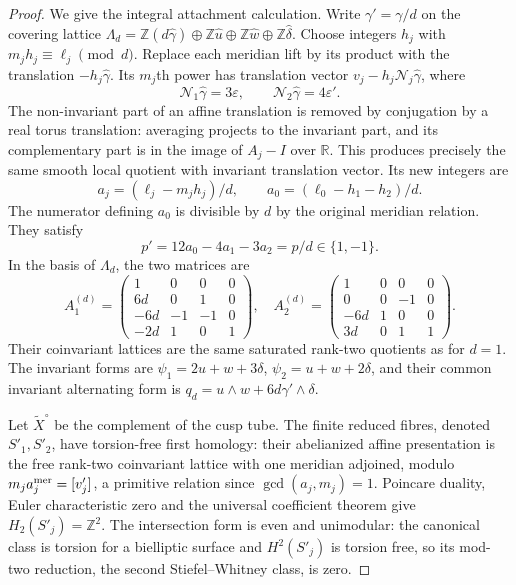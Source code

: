\begin{proof}
We give the integral attachment calculation. Write
$\gamma'=\gamma/d$ on the covering lattice
$\Lambda_d=\mathbb Z(d\widehat\gamma)\oplus\mathbb Z\widehat u
\oplus\mathbb Z\widehat w\oplus\mathbb Z\widehat\delta$.
Choose integers $h_j$ with
$m_jh_j\equiv\ell_j\pmod d$. Replace each meridian lift by its
product with the translation $-h_j\widehat\gamma$. Its $m_j$th power
has translation vector
$v_j-h_j\mathcal N_j\widehat\gamma$, where
\[
 \mathcal N_1\widehat\gamma=3\varepsilon,
 \qquad \mathcal N_2\widehat\gamma=4\varepsilon'.
\]
The non-invariant part of an affine translation is removed by
conjugation by a real torus translation: averaging projects to the
invariant part, and its complementary part is in the image of $A_j-I$
over $\mathbb R$. This produces precisely the same smooth local
quotient with invariant translation vector. Its new integers are
\[
 a_j=(\ell_j-m_jh_j)/d,\qquad
 a_0=(\ell_0-h_1-h_2)/d.
\]
The numerator defining $a_0$ is divisible by $d$ by the original
meridian relation. They satisfy
\[
 p'=12a_0-4a_1-3a_2=p/d\in\{1,-1\}.
\]
In the basis of $\Lambda_d$, the two matrices are
\[
 A_1^{(d)}=\begin{pmatrix}1&0&0&0\\6d&0&1&0\\-6d&-1&-1&0\\-2d&1&0&1\end{pmatrix},
 \quad
 A_2^{(d)}=\begin{pmatrix}1&0&0&0\\0&0&-1&0\\-6d&1&0&0\\3d&0&1&1\end{pmatrix}.
\]
Their coinvariant lattices are the same saturated rank-two quotients
as for $d=1$. The invariant forms are
$\psi_1=2u+w+3\delta$, $\psi_2=u+w+2\delta$,
and their common invariant alternating form is
$q_d=u\wedge w+6d\gamma'\wedge\delta$.

Let $\widetilde X^\circ$ be the complement of the cusp tube. The
finite reduced fibres, denoted $S'_1,S'_2$, have torsion-free first
homology: their abelianized affine presentation is the free rank-two
coinvariant lattice with one meridian adjoined, modulo
$m_ja_j^{\rm mer}=[v'_j]$, a primitive relation since
$\gcd(a_j,m_j)=1$. Poincare duality, Euler characteristic zero and
the universal coefficient theorem give $H_2(S'_j)=\mathbb Z^2$.
The intersection form is even and unimodular: the canonical class is
torsion for a bielliptic surface and $H^2(S'_j)$ is torsion free,
so its mod-two reduction, the second Stiefel--Whitney class, is zero.


\end{proof}
